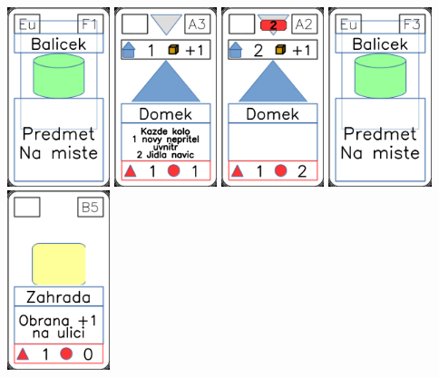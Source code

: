 \documentclass[a4paper]{article}
\begin{document}
	\includegraphics[width=3.0cm]{img-4_25}
	\includegraphics[width=3.0cm]{img-3_2}
	\includegraphics[width=3.0cm]{img-3_1}
	\includegraphics[width=3.0cm]{img-4_27}
	\includegraphics[width=3.0cm]{img-3_24}
\end{document}
